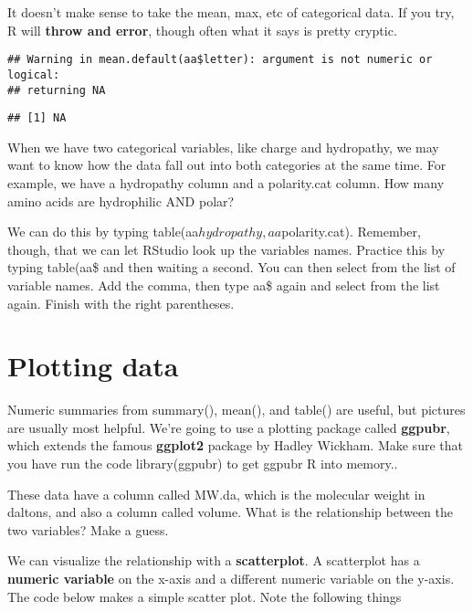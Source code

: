 \documentclass[
]{book}
\newenvironment{Shaded}{\begin{snugshade}}{\end{snugshade}}
\newcommand{\FunctionTok}[1]{\textcolor[rgb]{0.00,0.00,0.00}{#1}}
\newcommand{\NormalTok}[1]{#1}
\newcommand{\SpecialCharTok}[1]{\textcolor[rgb]{0.00,0.00,0.00}{#1}}
\begin{document}
It doesn't make sense to take the mean, max, etc of categorical data. If you try, R will \textbf{throw and error}, though often what it says is pretty cryptic.

\begin{Shaded}
\end{Shaded}

\begin{verbatim}
## Warning in mean.default(aa$letter): argument is not numeric or logical:
## returning NA
\end{verbatim}

\begin{verbatim}
## [1] NA
\end{verbatim}

When we have two categorical variables, like charge and hydropathy, we may want to know how the data fall out into both categories at the same time. For example, we have a hydropathy column and a polarity.cat column. How many amino acids are hydrophilic AND polar?

We can do this by typing table(aa\(hydropathy,aa\)polarity.cat). Remember, though, that we can let RStudio look up the variables names. Practice this by typing table(aa\$ and then waiting a second. You can then select from the list of variable names. Add the comma, then type aa\$ again and select from the list again. Finish with the right parentheses.

\hypertarget{plotting-data}{%
\section{Plotting data}\label{plotting-data}}

Numeric summaries from summary(), mean(), and table() are useful, but pictures are usually most helpful. We're going to use a plotting package called \textbf{ggpubr}, which extends the famous \textbf{ggplot2} package by Hadley Wickham. Make sure that you have run the code library(ggpubr) to get ggpubr R into memory..

These data have a column called MW.da, which is the molecular weight in daltons, and also a column called volume. What is the relationship between the two variables? Make a guess.

We can visualize the relationship with a \textbf{scatterplot}. A scatterplot has a \textbf{numeric variable} on the x-axis and a different numeric variable on the y-axis. The code below makes a simple scatter plot. Note the following things
\end{document}
